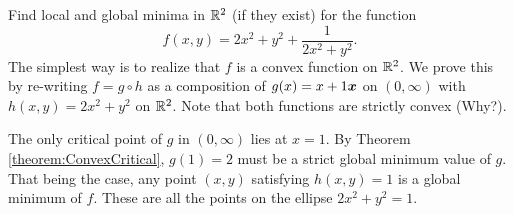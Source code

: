 \begin{example}
Find local and global minima in $\mathbb{R}^2$ (if they exist) for the function
\begin{equation*}
f(x,y) = 2x^2+y^2 + \frac{1}{2x^2+y^2}.
\end{equation*}
The simplest way is to realize that $f$ is a convex function on $\mathbb{R}^2$.  We prove this by re-writing $f=g\circ h$ as a composition of $g(x) = x+1\boldsymbol{x}$ on $(0,\infty)$ with $h(x,y) = 2x^2+y^2$ on $\mathbb{R}^2$.  Note that both functions are strictly convex (Why?).

The only critical point of $g$ in $(0,\infty)$ lies at $x=1$.  By Theorem \ref{theorem:ConvexCritical}, $g(1)=2$ must be a strict global minimum value of $g$.  That being the case, any point $(x,y)$ satisfying $h(x,y)=1$ is a global minimum of $f$.  These are all the points on the ellipse $2x^2+y^2=1$. 
\end{example}